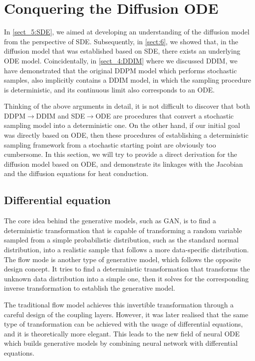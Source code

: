 \section{Conquering the Diffusion ODE}

In \cref{sect_5:SDE}, we aimed at developing an understanding of the diffusion model from the perspective of SDE. Subsequently, in \cref{sect:6}, we showed that, in the diffusion model that was established based on SDE, there exists an underlying ODE model. Coincidentally, in \cref{sect_4:DDIM} where we discussed DDIM, we have demonstrated that the original DDPM model which performs stochastic samples, also implicitly contains a DDIM model, in which the sampling procedure is deterministic, and its continuous limit also corresponds to an ODE. 

Thinking of the above arguments in detail, it is not difficult to discover that both DDPM$\to$DDIM and SDE$\to$ODE are procedures that convert a stochastic sampling model into a deterministic one. On the other hand, if our initial goal was directly based on ODE, then these procedures of establishing a deterministic sampling framework from a stochastic starting point are obviously too cumbersome. In this section, we will try to provide a direct derivation for the diffusion model based on ODE, and demonstrate its linkages with the Jacobian and the diffusion equations for heat conduction. 

\subsection{Differential equation}

The core idea behind the generative models, such as GAN, is to find a deterministic transformation that is capable of transforming a random variable sampled from a simple probabilistic distribution, such as the standard normal distribution, into a realistic sample that follows a more data-specific distribution. The flow mode is another type of generative model, which follows the opposite design concept. It tries to find a deterministic transformation that transforms the unknown data distribution into a simple one, then it solves for the corresponding inverse transformation to establish the generative model. 

The traditional flow model achieves this invertible transformation through a careful design of the coupling layers. However, it was later realised that the same type of transformation can be achieved with the usage of differential equations, and it is theoretically more elegant. This leads to the new field of neural ODE which builds generative models by combining neural network with differential equations. 

